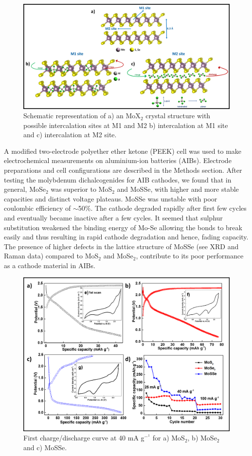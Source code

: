 \documentclass[num-refs]{wiley-article}
\begin{document}
\begin{figure}[t]
\centering
\includegraphics[width=\textwidth]{figures/scheme1}
\caption{Schematic representation of a) an MoX$_2$ crystal structure with possible intercalation sites at M1 and M2 b) intercalation at M1 site and c) intercalation at M2 site.}
\end{figure}

A modified two-electrode polyether ether ketone (PEEK) cell was used to make electrochemical measurements on aluminium-ion batteries (AIBs). Electrode preparations and cell configurations are described in the Methods section. After testing the molybdenum dichalcogenides for AIB cathodes, we found that in general, MoSe$_2$ was superior to MoS$_2$ and MoSSe, with higher and more stable capacities and distinct voltage plateaus. MoSSe was unstable with poor coulombic efficiency of $\sim$50\%. The cathode degraded rapidly after first few cycles and eventually became inactive after a few cycles. It seemed that sulphur substitution weakened the binding energy of Mo-Se allowing the bonds to break easily and thus resulting in rapid cathode degradation and hence, fading capacity. The presence of higher defects in the lattice structure of MoSSe (see XRD and Raman data) compared to MoS$_2$ and MoSe$_2$, contribute to its poor performance as a cathode material in AIBs.

\begin{figure}[h!]
\centering
\includegraphics[width=\textwidth]{figures/fig1}
\caption{First charge/discharge curve at 40 mA g$^-^1$ for a) MoS$_2$, b) MoSe$_2$ and c) MoSSe.}
\end{figure}
\end{document}
